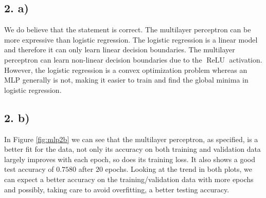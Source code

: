 \documentclass[11pt]{article}
\DeclareMathOperator{\relu}{ReLU}
\begin{document}
\subsection{2. a)}
We do believe that the statement is correct.
The multilayer perceptron can be more expressive than logistic regression.
The logistic regression is a linear model and therefore it can only learn linear decision boundaries.
The multilayer perceptron can learn non-linear decision boundaries due to the $\relu$ activation.
However, the logistic regression is a convex optimization problem whereas an MLP generally is not, making it easier to train and find the global minima in logistic regression.

\subsection{2. b)}
In Figure \ref{fig:mlp2b} we can see that the multilayer perceptron, as specified, is a better fit for the data, not only its accuracy on both training and validation data largely improves with each epoch, so does its training loss. It also shows a good test accuracy of $0.7580$ after $20$ epochs. Looking at the trend in both plots, we can expect a better accuracy on the training/validation data with more epochs and possibly, taking care to avoid overfitting, a better testing accuracy.
\end{document}
